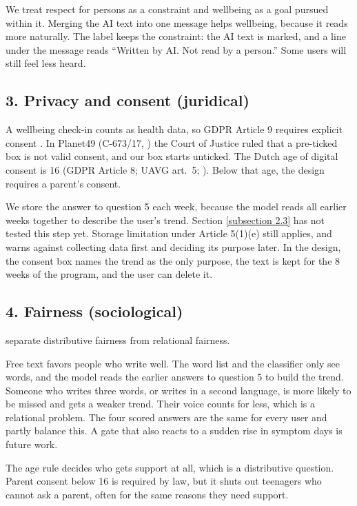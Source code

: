 \documentclass[a4paper]{article}
\begin{document}
We treat respect for persons as a constraint and wellbeing as a goal pursued within it. Merging the AI text into one message helps wellbeing, because it reads more naturally. The label keeps the constraint: the AI text is marked, and a line under the message reads \enquote{Written by AI. Not read by a person.} Some users will still feel less heard.

\subsection*{3. Privacy and consent (juridical)}
A wellbeing check-in counts as health data, so GDPR Article 9 requires explicit consent \citep{gdpr2016}. In Planet49 (C-673/17, \citeyear{planet49_2019}) the Court of Justice ruled that a pre-ticked box is not valid consent, and our box starts unticked. The Dutch age of digital consent is 16 (GDPR Article 8; UAVG art.~5; \citealp{uavg2018}). Below that age, the design requires a parent's consent.

We store the answer to question 5 each week, because the model reads all earlier weeks together to describe the user's trend. Section \ref{subsection 2.3} has not tested this step yet. Storage limitation under Article 5(1)(e) still applies, and \citet{dewitte2025gdpr} warns against collecting data first and deciding its purpose later. In the design, the consent box names the trend as the only purpose, the text is kept for the 8 weeks of the program, and the user can delete it.

\subsection*{4. Fairness (sociological)}
\citet{naudts2025fairness} separate distributive fairness from relational fairness.

Free text favors people who write well. The word list and the classifier only see words, and the model reads the earlier answers to question 5 to build the trend. Someone who writes three words, or writes in a second language, is more likely to be missed and gets a weaker trend. Their voice counts for less, which is a relational problem. The four scored answers are the same for every user and partly balance this. A gate that also reacts to a sudden rise in symptom days is future work.

The age rule decides who gets support at all, which is a distributive question. Parent consent below 16 is required by law, but it shuts out teenagers who cannot ask a parent, often for the same reasons they need support.
\end{document}

